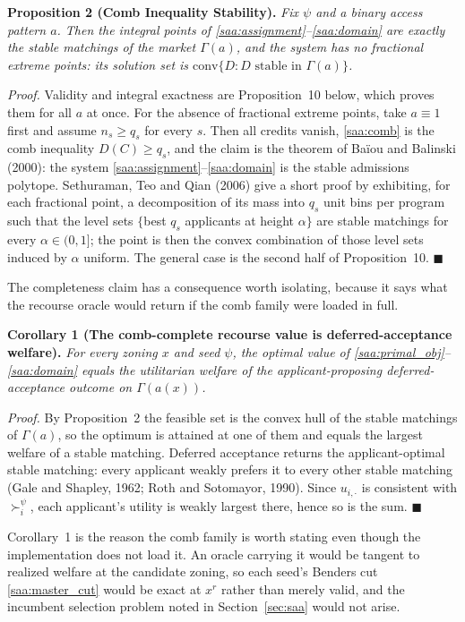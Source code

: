\documentclass{article}
\begin{document}
\noindent\textbf{Proposition 2 (Comb Inequality Stability).} \textit{Fix $\psi$ and a binary access pattern $a$. Then the integral points of \eqref{saa:assignment}--\eqref{saa:domain} are exactly the stable matchings of the market $\Gamma(a)$, and the system has no fractional extreme points: its solution set is $\mathrm{conv}\{D : D \text{ stable in } \Gamma(a)\}$.} 

\textit{Proof.} Validity and integral exactness are Proposition~10 below, which proves them for all $a$ at once. For the absence of fractional extreme points, take $a \equiv 1$ first and assume $n_s \ge q_s$ for every $s$. Then all credits vanish, \eqref{saa:comb} is the comb inequality $D(C) \ge q_s$, and the claim is the theorem of Baïou and Balinski (2000): the system \eqref{saa:assignment}--\eqref{saa:domain} is the stable admissions polytope. Sethuraman, Teo and Qian (2006) give a short proof by exhibiting, for each fractional point, a decomposition of its mass into $q_s$ unit bins per program such that the level sets $\{$best $q_s$ applicants at height $\alpha\}$ are stable matchings for every $\alpha \in (0,1]$; the point is then the convex combination of those level sets induced by $\alpha$ uniform. The general case is the second half of Proposition~10. $\blacksquare$ 

The completeness claim has a consequence worth isolating, because it says what the recourse oracle would return if the comb family were loaded in full.

\noindent\textbf{Corollary 1 (The comb-complete recourse value is deferred-acceptance welfare).} \textit{For every zoning $x$ and seed $\psi$, the optimal value of \eqref{saa:primal_obj}--\eqref{saa:domain} equals the utilitarian welfare of the applicant-proposing deferred-acceptance outcome on $\Gamma(a(x))$.}

\textit{Proof.} By Proposition~2 the feasible set is the convex hull of the stable matchings of $\Gamma(a)$, so the optimum is attained at one of them and equals the largest welfare of a stable matching. Deferred acceptance returns the applicant-optimal stable matching: every applicant weakly prefers it to every other stable matching (Gale and Shapley, 1962; Roth and Sotomayor, 1990). Since $u_{i,\cdot}$ is consistent with $\succ_i^\psi$, each applicant's utility is weakly largest there, hence so is the sum. $\blacksquare$

Corollary~1 is the reason the comb family is worth stating even though the implementation does not load it. An oracle carrying it would be tangent to realized welfare at the candidate zoning, so each seed's Benders cut \eqref{saa:master_cut} would be exact at $x^r$ rather than merely valid, and the incumbent selection problem noted in Section~\ref{sec:saa} would not arise.
\end{document}
